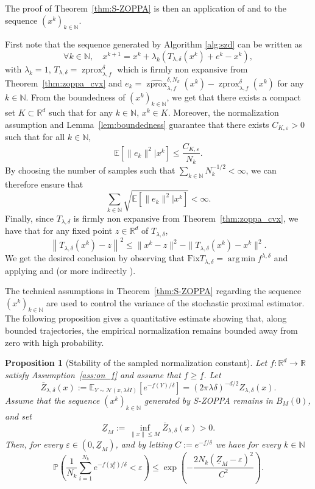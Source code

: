 \documentclass{article}
\newtheorem{proposition}{Proposition}
\newcommand{\R}{\mathbb{R}}
\newcommand{\zprox}{\ensuremath{\operatorname{zprox}}}
\newcommand{\szprox}{\ensuremath{\widehat{\operatorname{zprox}}}}
\newcommand{\Fix}
{\mathrm{Fix}}
\DeclareMathOperator*{\argmin}{arg\,min}
\begin{document}
The proof of Theorem~\ref{thm:S-ZOPPA} is then an application of \cite[Theorem~2.5]{combettes2015stochastic} and \cite[Theorem~4.1]{combettes2026} to the sequence \(\left(x^k\right)_{k\in\mathbb{N}}\).

First note that the sequence generated by Algorithm \ref{alg:szd} can be written as
    \[\forall k\in\mathbb{N},\quad x^{k+1}=x^k+\lambda_k(T_{\lambda,\delta}(x^k)+e^k-x^k),\]
    with \(\lambda_k=1\), \(T_{\lambda,\delta}=\zprox^{\delta}_{\lambda, f}\) which is firmly non expansive from Theorem~\ref{thm:zoppa_cvx} and \(e_k=\szprox^{\delta,N_k}_{\lambda, f}(x^k)-\zprox^{\delta}_{\lambda, f}(x^k)\) for any \(k\in\mathbb{N}\). From the boundedness of \(\left(x^k\right)_{k\in\mathbb{N}}\), we get that there exists a compact set \(K\subset\R^d\) such that for any \(k\in\mathbb{N}\), \(x^k\in K\). Moreover, the normalization assumption and Lemma~\ref{lem:boundedness} guarantee that there exists \(C_{K,\varepsilon}>0\) such that for all \(k\in\mathbb{N}\),
    \[\mathbb{E}\left[\|e_k\|^2|x^k\right]\le\frac{C_{K,\varepsilon}}{N_k}.\]
    By choosing the number of samples such that \(\sum_{k\in\mathbb{N}}N_k^{-1/2}<\infty\), we can therefore ensure that
    \[\sum_{k\in\mathbb{N}}\sqrt{\mathbb{E}\left[\|e_k\|^2|x^k\right]}<\infty.\]
    Finally, since \(T_{\lambda,\delta}\) is firmly non expansive from Theorem~\ref{thm:zoppa_cvx}, we have that for any fixed point \(z\in\R^d\) of \(T_{\lambda,\delta}\),
    \[\left\|T_{\lambda,\delta}(x^k)-z\right\|^2\le \|x^k-z\|^2-\|T_{\lambda,\delta}(x^k)-x^k\|^2.\]
    We get the desired conclusion by observing that $\Fix T_{\lambda,\delta} = \argmin f^{\lambda,\delta}$ and applying \cite[Theorem~2.5]{combettes2015stochastic} and \cite[Theorem~4.1]{combettes2026} (or more indirectly \cite[Proposition~5.1]{combettes2015stochastic}).

The technical assumptions in Theorem~\ref{thm:S-ZOPPA} regarding the sequence
\((x^k)_{k\in\mathbb{N}}\) are used to control the variance of the stochastic proximal estimator.
The following proposition gives a quantitative estimate showing that, along bounded trajectories,
the empirical normalization remains bounded away from zero with high probability.

\begin{proposition}[Stability of the sampled normalization constant]\label{prop:stability}
Let \(f:\mathbb{R}^d\to\mathbb{R}\) satisfy Assumption~\ref{ass:on_f} and assume that
\(f\ge \underline f\). Let
\[
    \bar Z_{\lambda,\delta}(x)
    :=
    \mathbb{E}_{Y\sim\mathcal N(x,\lambda\delta I)}
    \left[e^{-f(Y)/\delta}\right]
    =
    (2\pi\lambda\delta)^{-d/2}Z_{\lambda,\delta}(x).
\]
Assume that the sequence \((x^k)_{k\in\mathbb{N}}\) generated by S-ZOPPA remains in
\(B_M(0)\), and set
\[
    \underline Z_M
    :=
    \inf_{\|x\|\le M}\bar Z_{\lambda,\delta}(x)>0.
\]
Then, for every \(\varepsilon\in(0,\underline Z_M)\), and by letting $C:=e^{-\underline f/\delta}$ we have for every \(k\in\mathbb{N}\)
\[
\mathbb{P}\left(
    \frac1{N_k}\sum_{i=1}^{N_k}e^{-f(y_i^k)/\delta}
    <
    \varepsilon
\right)
\le
\exp\left(
-\frac{2N_k(\underline Z_M-\varepsilon)^2}{C^2}
\right).
\]
\end{proposition}
\end{document}
